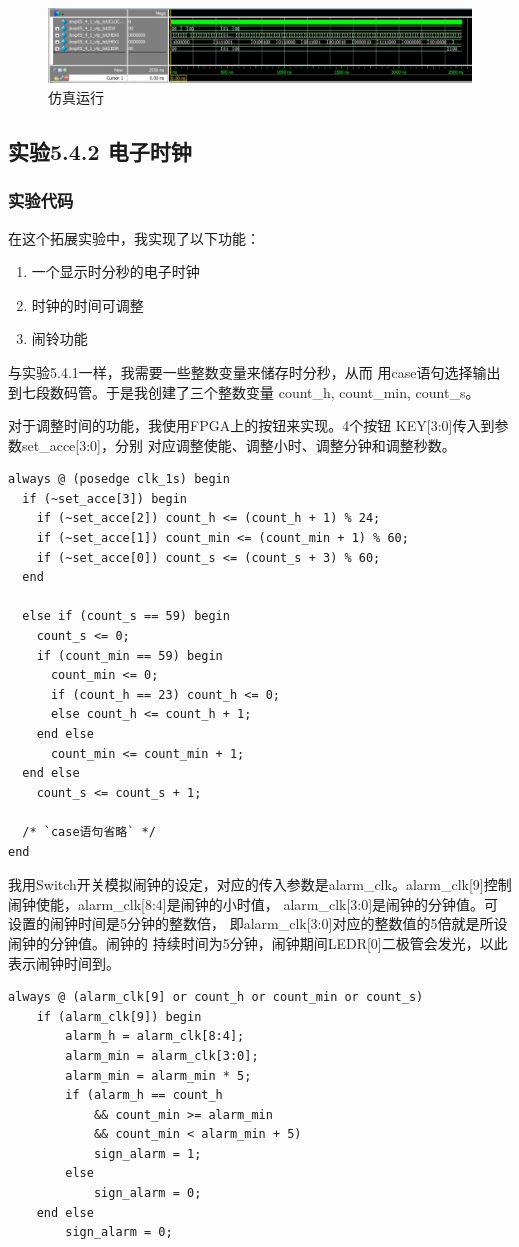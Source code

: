 \documentclass[12pt,a4paper,UTF8]{article}
\begin{document}
\begin{figure}[H]
  \centering
  \includegraphics[width=1\textwidth]{1_sim.JPG}
  \caption{仿真运行}
  \label{1_sim}
\end{figure}

\subsection{实验5.4.2 电子时钟}
\subsubsection{实验代码}
在这个拓展实验中，我实现了以下功能：
\begin{enumerate}
  \item 一个显示时分秒的电子时钟
  \item 时钟的时间可调整
  \item 闹铃功能
\end{enumerate}

与实验5.4.1一样，我需要一些整数变量来储存时分秒，从而
用case语句选择输出到七段数码管。于是我创建了三个整数变量
count\_h, count\_min, count\_s。

对于调整时间的功能，我使用FPGA上的按钮来实现。4个按钮
KEY[3:0]\linebreak[4]传入到参数set\_acce[3:0]，分别
对应调整使能、调整小时、调整分钟和调整秒数。
\begin{lstlisting}[style=verilog-style]
always @ (posedge clk_1s) begin
  if (~set_acce[3]) begin
    if (~set_acce[2]) count_h <= (count_h + 1) % 24;
    if (~set_acce[1]) count_min <= (count_min + 1) % 60;
    if (~set_acce[0]) count_s <= (count_s + 3) % 60;
  end

  else if (count_s == 59) begin
    count_s <= 0;
    if (count_min == 59) begin
      count_min <= 0;
      if (count_h == 23) count_h <= 0;
      else count_h <= count_h + 1;
    end else 
      count_min <= count_min + 1;
  end else
    count_s <= count_s + 1;

  /* `case语句省略` */
end
\end{lstlisting}

我用Switch开关模拟闹钟的设定，对应的传入参数是alarm\_clk。\linebreak[4]
alarm\_clk[9]控制闹钟使能，alarm\_clk[8:4]是闹钟的小时值，
alarm\_clk[3:0]是闹钟的分钟值。可设置的闹钟时间是5分钟的整数倍，
即alarm\_clk[3:0]对应的整数值的5倍就是所设闹钟的分钟值。闹钟的
持续时间为5分钟，闹钟期间LEDR[0]二极管会发光，以此表示闹钟时间到。
\begin{lstlisting}[style=verilog-style]
always @ (alarm_clk[9] or count_h or count_min or count_s)
	if (alarm_clk[9]) begin
		alarm_h = alarm_clk[8:4];
		alarm_min = alarm_clk[3:0];
		alarm_min = alarm_min * 5;
		if (alarm_h == count_h 
			&& count_min >= alarm_min 
			&& count_min < alarm_min + 5)
			sign_alarm = 1;
		else 
			sign_alarm = 0;
	end else
		sign_alarm = 0;
\end{lstlisting}
\end{document}

